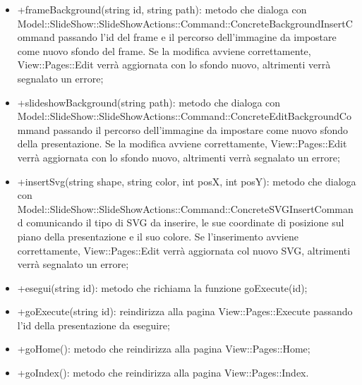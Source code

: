 {{\begin{itemize}
						\item +frameBackground(string id, string path): metodo che dialoga con Model::SlideShow::SlideShowActions::Command::ConcreteBackgroundInsertCommand passando l'id del frame e il percorso dell'immagine da impostare come nuovo sfondo del frame. Se la modifica avviene correttamente, View::Pages::Edit verrà aggiornata con lo sfondo nuovo, altrimenti verrà segnalato un errore;
						\item +slideshowBackground(string path): metodo che dialoga con Model::SlideShow::SlideShowActions::Command::ConcreteEditBackgroundCommand passando il percorso dell'immagine da impostare come nuovo sfondo della presentazione. Se la modifica avviene correttamente, View::Pages::Edit verrà aggiornata con lo sfondo nuovo, altrimenti verrà segnalato un errore;
						\item +insertSvg(string shape, string color, int posX, int posY): metodo che dialoga con Model::SlideShow::SlideShowActions::Command::ConcreteSVGInsertCommand comunicando il tipo di SVG da inserire, le sue coordinate di posizione sul piano della presentazione e il suo colore. Se l'inserimento avviene correttamente, View::Pages::Edit verrà aggiornata col nuovo SVG, altrimenti verrà segnalato un errore;
						\item +esegui(string id): metodo che richiama la funzione goExecute(id);
						\item +goExecute(string id): reindirizza alla pagina View::Pages::Execute passando l'id della presentazione da eseguire;
						\item +goHome(): metodo che reindirizza alla pagina View::Pages::Home;
						\item +goIndex(): metodo che reindirizza alla pagina View::Pages::Index.
					\end{itemize}
				}
				}